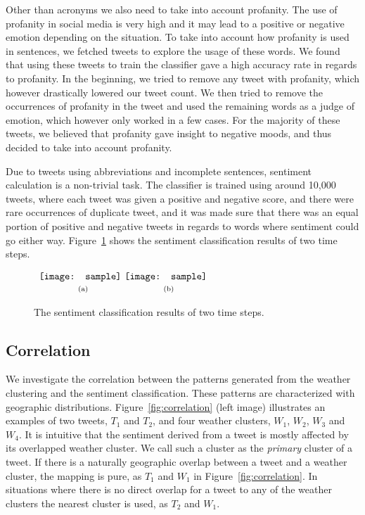 Other than acronyms we also need to take into account profanity. The use of profanity in social media is very high and it may lead to a positive or negative emotion depending on the situation. To take into account how profanity is used in sentences, we fetched tweets to explore the usage of these words. We found that using these tweets to train the classifier gave a high accuracy rate in regards to profanity. In the beginning, we tried to remove any tweet with profanity, which however drastically lowered our tweet count. We then tried to remove the occurrences of profanity in the tweet and used the remaining words as a judge of emotion, which however only worked in a few cases. For the majority of these tweets, we believed that profanity gave insight to negative moods, and thus decided to take into account profanity.

Due to tweets using abbreviations and incomplete sentences, sentiment calculation is a non-trivial task. The classifier is trained using around 10,000 tweets, where each tweet was given a positive and negative score, and there were rare occurrences of duplicate tweet, and it was made sure that there was an equal portion of positive and negative tweets in regards to words where sentiment could go either way. Figure~\ref{fig:sentiment} shows the sentiment classification results of two time steps.

\begin{figure}[t]
\begin{center}
$\begin{array}{c@{\hspace{0.01\linewidth}}c}
\texttt{[image: sample]} &
\texttt{[image: sample]}
\\
\mbox{\small{(a)}} & \mbox{\small{(b)}}
\end{array}$
\end{center}
\vspace{-.1in}
\caption{The sentiment classification results of two time steps.}
\label{fig:sentiment}
\end{figure}


\subsection{Correlation}
\label{sec:corr}

We investigate the correlation between the patterns generated from the weather clustering and the sentiment classification. These patterns are characterized with geographic distributions. Figure~\ref{fig:correlation} (left image) illustrates an examples of two tweets, $T_1$ and $T_2$, and four weather clusters, $W_1$, $W_2$, $W_3$ and $W_4$. It is intuitive that the sentiment derived from a tweet is mostly affected by its overlapped weather cluster. We call such a cluster as the \emph{primary} cluster of a tweet. If there is a naturally geographic overlap between a tweet and a weather cluster, the mapping is pure, as $T_1$ and $W_1$ in Figure~\ref{fig:correlation}. In situations where there is no direct overlap for a tweet to any of the weather clusters the nearest cluster is used, as $T_2$ and $W_1$.

